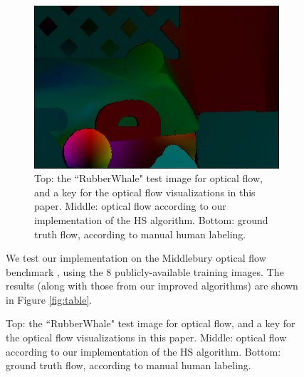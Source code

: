 \documentclass[10pt,twocolumn,letterpaper]{article}
\begin{document}
\begin{figure}
\begin{figure}
\includegraphics[width=\columnwidth]{ground_truth.png}
\caption{Top: the ``RubberWhale" test image for optical flow, and a key for the optical flow visualizations in this paper.  Middle: optical flow according to our implementation of the HS algorithm.  Bottom: ground truth flow, according to manual human labeling.}
\label{fig:hs}
\end{figure}

We test our implementation on the Middlebury optical flow benchmark \cite{middlebury}, using the 8 publicly-available training images.  The results (along with those from our improved algorithms) are shown in Figure \ref{fig:table}.


\end{figure}
\end{document}
